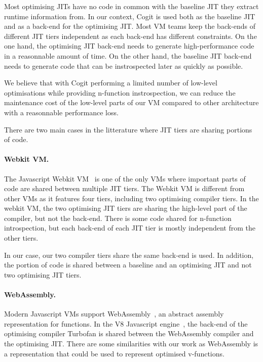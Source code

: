\documentclass[a4paper,12pt,twoside]{../includes/ThesisStyle}
\begin{document}
Most optimising JITs have no code in common with the baseline JIT they extract runtime information from. In our context, Cogit is used both as the baseline JIT and as a back-end for the optimising JIT. Most VM teams keep the back-ends of different JIT tiers independent as each back-end has different constraints. On the one hand, the optimising JIT back-end needs to generate high-performance code in a reasonnable amount of time. On the other hand, the baseline JIT back-end needs to generate code that can be instrospected later as quickly as possible. 

We believe that with Cogit performing a limited number of low-level optimisations while providing n-function instrospection, we can reduce the maintenance cost of the low-level parts of our VM compared to other architecture with a reasonnable performance loss. 

There are two main cases in the litterature where JIT tiers are sharing portions of code.

\paragraph{Webkit VM.}The Javascript Webkit VM~\cite{Webkit15} is one of the only VMs where important parts of code are shared between multiple JIT tiers. The Webkit VM is different from other VMs as it features four tiers, including two optimising compiler tiers. In the webkit VM, the two optimising JIT tiers are sharing the high-level part of the compiler, but not the back-end. There is some code shared for n-function introspection, but each back-end of each JIT tier is mostly independent from the other tiers.

In our case, our two compiler tiers share the same back-end is used. In addition, the portion of code is shared between a baseline and an optimising JIT and not two optimising JIT tiers.

\paragraph{WebAssembly.}Modern Javascript VMs support WebAssembly~\cite{WebAssembly}, an abstract assembly representation for functions. In the V8 Javascript engine~\cite{V8}, the back-end of the optimising compiler Turbofan is shared between the WebAssembly compiler and the optimising JIT. There are some similarities with our work as WebAssembly is a representation that could be used to represent optimised v-functions. 
\end{document}
